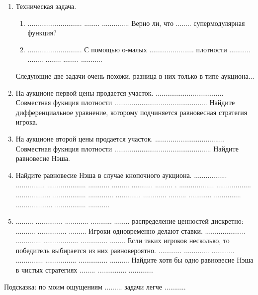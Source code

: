 \documentclass[pdftex,12pt,a4paper]{article}
\begin{document}
\begin{enumerate}

\item Техническая задача. 
\begin{enumerate}
\item ............................ ........ .............. Верно ли, что ........ супермодулярная функция?
\item ............................ С помощью о-малых ....................... плотности ........... ........ ........ ........ ...........
\end{enumerate}

Следующие две задачи очень похожи, разница в них только в типе аукциона...

\item На аукционе первой цены продается участок. ................................... Совместная фукнция плотности ................................................ Найдите дифференциальное уравнение, которому подчиняется равновесная стратегия игрока. 

\item На аукционе второй цены продается участок. .................................... Совместная фукнция плотности  ..................................................  Найдите равновесие Нэша.


\item Найдите равновесие Нэша в случае кнопочного аукциона. ................. ............... .................... ........... ......... ........... ......... . .................. .................. .................. ................. ............. ............. ............ ......... ............ .............. ................... ................ ........... 

\item ......... .............. ............ ...........  ........ распределение ценностей дискретно: .......... ............... ......... Игроки одновременно делают ставки. ..................... ............. .................. .............. ........ Если таких игроков несколько, то победитель выбирается из них равновероятно. ............ ............. ............ .............. ................ ............... ..........  Найдите хотя бы одно равновесие Нэша в чистых стратегиях ........ ............... ............. 


\end{enumerate}


Подсказка: по моим ощущениям ......... задачи легче ...........



\printindex %
\end{document}
